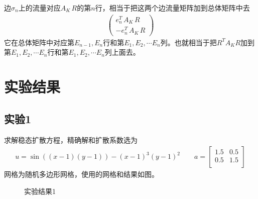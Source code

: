 \documentclass[12pt,a4paper]{article}
\theoremstyle{plain}
\begin{document}
边$\sigma_n$上的流量对应$A_K \, R$的第$n$行，相当于把这两个边流量矩阵加到总体矩阵中去
\begin{align*}
\left(
\begin{matrix}
e_{n}^T \, A_K \, R \\
-e_{n}^T \, A_K \, R
\end{matrix}
\right)
\end{align*}
它在总体矩阵中对应第$E_{n-1}, E_{n}$行和第$E_1, E_2, \cdots E_n$列。也就相当于把$R^T A_K R$加到第$E_1, E_2, \cdots E_n$行和第$E_1, E_2, \cdots E_n$列上面去。

\section*{实验结果}

\subsection*{实验1}

求解稳态扩散方程，精确解和扩散系数选为
\begin{align*}
u = \sin((x-1)(y-1)) - (x-1)^3 (y-1)^2 \qquad
a = \left[
\begin{matrix}
1.5 & 0.5 \\
0.5 & 1.5 \\
\end{matrix}
\right]
\end{align*}
网格为随机多边形网格，使用的网格和结果如图。

\begin{figure}[H]
\centering
{}
\caption{实验结果1}
\end{figure}
\end{document}
